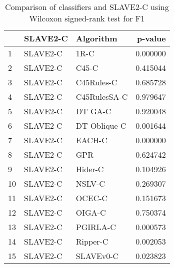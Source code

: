 \begin{table}
\footnotesize
\caption{Comparison of classifiers and SLAVE2-C using Wilcoxon signed-rank test for F1}
\label{tab:SLAVE2-C wilcoxon F1 comparison}
\begin{tabular}{lllr}
\hline
 & SLAVE2-C & Algorithm & p-value \\
\hline
1 & SLAVE2-C & 1R-C & 0.000000 \\
2 & SLAVE2-C & C45-C & 0.415044 \\
3 & SLAVE2-C & C45Rules-C & 0.685728 \\
4 & SLAVE2-C & C45RulesSA-C & 0.979647 \\
5 & SLAVE2-C & DT GA-C & 0.920048 \\
6 & SLAVE2-C & DT Oblique-C & 0.001644 \\
7 & SLAVE2-C & EACH-C & 0.000000 \\
8 & SLAVE2-C & GPR & 0.624742 \\
9 & SLAVE2-C & Hider-C & 0.104926 \\
10 & SLAVE2-C & NSLV-C & 0.269307 \\
11 & SLAVE2-C & OCEC-C & 0.151673 \\
12 & SLAVE2-C & OIGA-C & 0.750374 \\
13 & SLAVE2-C & PGIRLA-C & 0.000573 \\
14 & SLAVE2-C & Ripper-C & 0.002053 \\
15 & SLAVE2-C & SLAVEv0-C & 0.023823 \\
\hline
\end{tabular}
\end{table}
